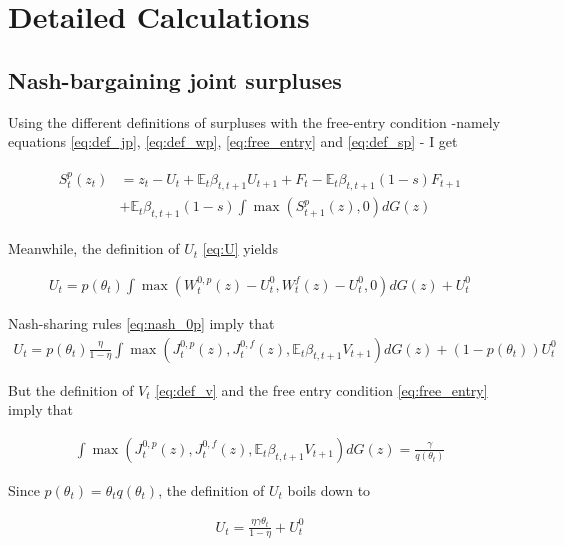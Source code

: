 \section{Detailed Calculations}

\subsection{Nash-bargaining joint surpluses}
\label{sec:nb_surplus}

Using the different definitions of surpluses with the free-entry condition -namely equations \eqref{eq:def_jp}, \eqref{eq:def_wp}, \eqref{eq:free_entry} and \eqref{eq:def_sp} - I get

\begin{align} \label{eq:sp_appendix}
\begin{split}
S_t^p \left( z_t \right) &= z_t - U_t + \mathbb{E}_t \beta_{t, t+1} U_{t+1} + F_t - \mathbb{E}_t \beta_{t,t+1} (1-s) F_{t+1}\\
&+ \mathbb{E}_t  \beta_{t,t+1} (1-s) \int \max \left( S_{t+1}^p (z), 0\right) dG(z)
\end{split}
\end{align}

Meanwhile, the definition of $U_t$ \eqref{eq:U} yields

\begin{align}
U_t = p\left(\theta_t \right) \int \max \left( W_t^{0,p} (z)-U_t^0, W_t^f (z)-U_t^0, 0 \right) dG(z) + U_{t}^0
\end{align}

Nash-sharing rules \eqref{eq:nash_0p} imply that
\begin{align}
U_t = p\left(\theta_t \right) \frac{\eta}{1-\eta} \int \max \left( J_t^{0,p} (z), J_t^{0,f} (z), \mathbb{E}_t \beta_{t, t+1} V_{t+1} \right) dG(z) + \left( 1 - p\left( \theta_t \right) \right) U_{t}^0
\end{align}

But the definition of $V_t$ \eqref{eq:def_v} and the free entry condition \eqref{eq:free_entry} imply that

\begin{align}
\int \max \left( J_t^{0,p} (z), J_t^{0,f} (z), \mathbb{E}_t \beta_{t, t+1} V_{t+1} \right) dG(z) = \frac{\gamma}{q\left( \theta_t \right)}
\end{align}

Since $p \left( \theta_t \right) = \theta_t q \left( \theta_t \right)$, the definition of $U_t$ boils down to

\begin{align}
U_t = \frac{\eta \gamma \theta_t}{1-\eta} + U_t^0
\end{align}

